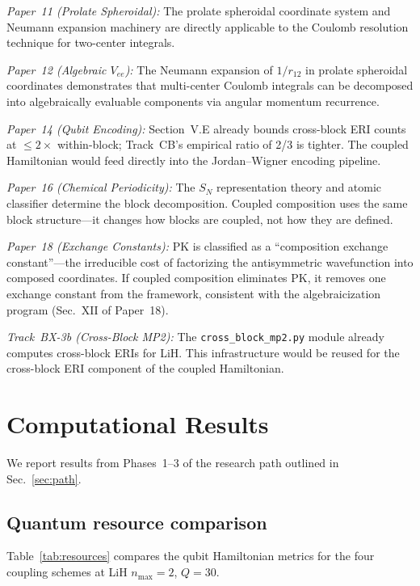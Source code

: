 \documentclass[aps,pra,twocolumn,superscriptaddress,longbibliography]{revtex4-2}
\begin{document}
\emph{Paper~11 (Prolate Spheroidal):} The prolate spheroidal
coordinate system and Neumann expansion machinery are directly
applicable to the Coulomb resolution technique for two-center
integrals.

\emph{Paper~12 (Algebraic $V_{ee}$):} The Neumann expansion of
$1/r_{12}$ in prolate spheroidal coordinates demonstrates that
multi-center Coulomb integrals can be decomposed into algebraically
evaluable components via angular momentum recurrence.

\emph{Paper~14 (Qubit Encoding):} Section~V.E already bounds
cross-block ERI counts at $\le 2\times$ within-block; Track~CB's
empirical ratio of 2/3 is tighter.  The coupled Hamiltonian would
feed directly into the Jordan--Wigner encoding pipeline.

\emph{Paper~16 (Chemical Periodicity):} The $S_N$ representation
theory and atomic classifier determine the block decomposition.
Coupled composition uses the same block structure---it changes how
blocks are coupled, not how they are defined.

\emph{Paper~18 (Exchange Constants):} PK is classified as a
``composition exchange constant''---the irreducible cost of factorizing
the antisymmetric wavefunction into composed coordinates.
If coupled composition eliminates PK, it removes one exchange constant
from the framework, consistent with the algebraicization program
(Sec.~XII of Paper~18).

\emph{Track~BX-3b (Cross-Block MP2):} The \texttt{cross\_block\_mp2.py}
module already computes cross-block ERIs for LiH.  This infrastructure
would be reused for the cross-block ERI component of the coupled
Hamiltonian.


\section{Computational Results}
\label{sec:results}

We report results from Phases~1--3 of the research path outlined in
Sec.~\ref{sec:path}.

\subsection{Quantum resource comparison}

Table~\ref{tab:resources} compares the qubit Hamiltonian metrics for
the four coupling schemes at LiH $n_{\max} = 2$, $Q = 30$.
\end{document}
